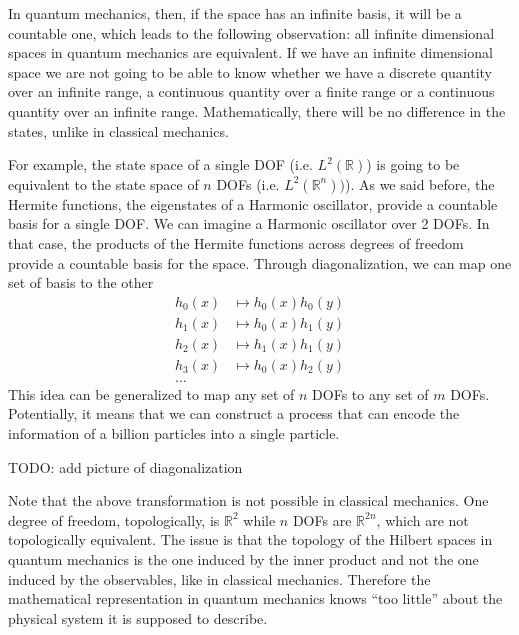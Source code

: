 In quantum mechanics, then, if the space has an infinite basis, it will be a countable one, which leads to the following observation: all infinite dimensional spaces in quantum mechanics are equivalent. If we have an infinite dimensional space we are not going to be able to know whether we have a discrete quantity over an infinite range, a continuous quantity over a finite range or a continuous quantity over an infinite range. Mathematically, there will be no difference in the states, unlike in classical mechanics.

For example, the state space of a single DOF (i.e. $L^2(\mathbb{R})$) is going to be equivalent to the state space of $n$ DOFs (i.e. $L^2(\mathbb{R}^n))$). As we said before, the Hermite functions, the eigenstates of a Harmonic oscillator, provide a countable basis for a single DOF. We can imagine a Harmonic oscillator over 2 DOFs. In that case, the products of the Hermite functions across degrees of freedom provide a countable basis for the space. Through diagonalization, we can map one set of basis to the other
\begin{align}
	h_0(x) &\mapsto h_0(x)h_0(y) \\
	h_1(x) &\mapsto h_0(x)h_1(y) \\
	h_2(x) &\mapsto h_1(x)h_1(y) \\
	h_3(x) &\mapsto h_0(x)h_2(y) \\
	\dots
\end{align}
This idea can be generalized to map any set of $n$ DOFs to any set of $m$ DOFs. Potentially, it means that we can construct a process that can encode the information of a billion particles into a single particle.

TODO: add picture of diagonalization


Note that the above transformation is not possible in classical mechanics. One degree of freedom, topologically, is $\mathbb{R}^2$ while $n$ DOFs are $\mathbb{R}^{2n}$, which are not topologically equivalent. The issue is that the topology of the Hilbert spaces in quantum mechanics is the one induced by the inner product and not the one induced by the observables, like in classical mechanics. Therefore the mathematical representation in quantum mechanics knows ``too little'' about the physical system it is supposed to describe.


